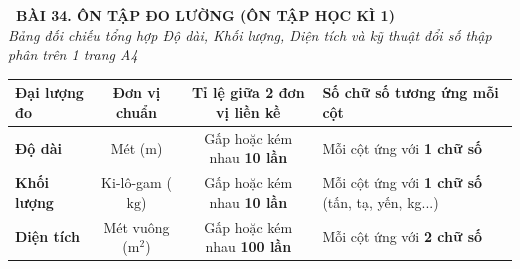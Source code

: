 \documentclass[14pt,a4paper,oneside]{extbook}
\begin{document}
\noindent
\begin{tcolorbox}[
  enhanced,
  colback=teal!8!white,
  colframe=teal!80!black,
  arc=3mm,
  boxrule=1.1pt,
  width=\linewidth,
  halign=center,
  top=2.2mm, bottom=2.2mm,
  left=3mm, right=3mm,
  drop fuzzy shadow
]
  {\large\bfseries\color{teal!95!black}\faBookmark\ BÀI 34. ÔN TẬP ĐO LƯỜNG (ÔN TẬP HỌC KÌ 1)}\\[2pt]
  {\scriptsize\color{black!75}\itshape Bảng đối chiếu tổng hợp Độ dài, Khối lượng, Diện tích và kỹ thuật đổi số thập phân trên 1 trang A4}
\end{tcolorbox}

\vspace{3.2mm}
\noindent
\begin{tcolorbox}[
  enhanced,
  title={\footnotesize\bfseries\color{white}\faBalanceScale\ 1. So sánh ba hệ thống đơn vị đo lường cơ bản},
  colback=blue!2!white,
  colframe=blue!75!black,
  arc=2.5mm, boxrule=0.8pt, top=1.8mm, bottom=1.8mm, left=2mm, right=2mm
]
  \scriptsize
  \centering
  \begin{tabular}{|l|c|c|l|}
    \hline
    \textbf{Đại lượng đo} & \textbf{Đơn vị chuẩn} & \textbf{Tỉ lệ giữa 2 đơn vị liền kề} & \textbf{Số chữ số tương ứng mỗi cột} \\ \hline
    \textbf{Độ dài} & Mét ($\text{m}$) & Gấp hoặc kém nhau \textbf{10 lần} & Mỗi cột ứng với \textbf{1 chữ số} \\ \hline
    \textbf{Khối lượng} & Ki-lô-gam ($\text{kg}$) & Gấp hoặc kém nhau \textbf{10 lần} & Mỗi cột ứng với \textbf{1 chữ số} (tấn, tạ, yến, kg...) \\ \hline
    \textbf{Diện tích} & Mét vuông ($\text{m}^2$) & Gấp hoặc kém nhau \textbf{100 lần} & Mỗi cột ứng với \textbf{2 chữ số} \\ \hline
  \end{tabular}
\end{tcolorbox}

\vspace{3mm}
\end{document}
